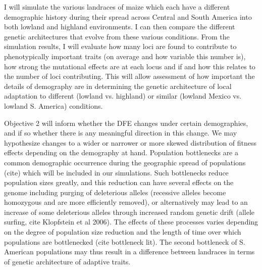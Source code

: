  I will simulate the various landraces of maize which each have a different demographic history during their spread across Central and South America into both lowland and highland environments.  I can then compare the different genetic architectures that evolve from these various conditions. From the simulation results, I will evaluate how many loci are found to contribute to phenotypically important traits (on average and how variable this number is), how strong the mutational effects are at each locus and if and how this relates to the number of loci contributing. This will allow assessment of how important the details of demography are in determining the genetic architecture of local adaptation to different (lowland vs. highland) or similar (lowland Mexico vs. lowland S. America) conditions. 

Objective 2 will inform whether the DFE changes under certain demographies, and if so whether there is any meaningful direction in this change. We may hypothesize changes to a wider or narrower or more skewed distribution of fitness effects depending on the demography at hand. Population bottlenecks are a common demographic occurrence during the geographic spread of populations (cite) which will be included in our simulations. Such bottlenecks reduce population sizes greatly, and this reduction can have several effects on the genome including purging of deleterious alleles (recessive alleles become homozygous and are more efficiently removed), or alternatively may lead to an increase of some deleterious alleles through increased random genetic drift (allele surfing, cite Klopfstein et al 2006). The effects of these processes varies depending on the degree of population size reduction and the length of time over which populations are bottlenecked (cite bottleneck lit). The second bottleneck of S. American populations may thus result in a difference between landraces in terms of genetic architecture of adaptive traits. 

